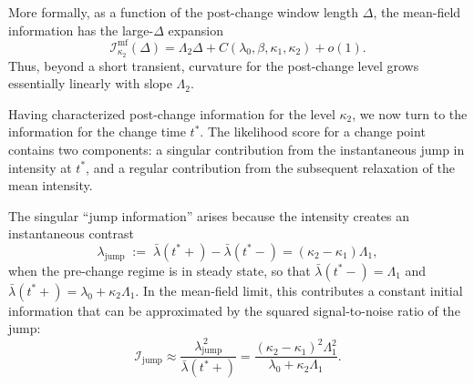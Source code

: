 \documentclass{article}
\theoremstyle{plain}
\theoremstyle{definition}
\newcommand{\1}{\mathbf{1}}
\begin{document}
    More formally, as a function of the post-change window length $\Delta$, the mean-field information has the large-$\Delta$ expansion
    \begin{equation}
    \label{eq:Ikappa2-mf-asymp}
    \mathcal I_{\kappa_2}^{\mathrm{mf}}(\Delta)
    =\Lambda_2 \Delta + C(\lambda_0,\beta,\kappa_1,\kappa_2) + o(1).
    \end{equation}
    Thus, beyond a short transient, curvature for the post-change level grows essentially linearly with slope $\Lambda_2$.
    
    Having characterized post-change information for the level $\kappa_2$, we now turn to the information for the change time $t^\ast$. The likelihood score for a change point contains two components: a singular contribution from the instantaneous jump in intensity at $t^\ast$, and a regular contribution from the subsequent relaxation of the mean intensity.
    
    The singular ``jump information'' arises because the intensity creates an instantaneous contrast
    \[
    \lambda_{\mathrm{jump}}
    \;:=\;
    \bar\lambda(t^\ast+)-\bar\lambda(t^\ast-)
    =
    (\kappa_2-\kappa_1)\Lambda_1,
    \]
    when the pre-change regime is in steady state, so that $\bar\lambda(t^\ast-)=\Lambda_1$ and $\bar\lambda(t^\ast+)=\lambda_0+\kappa_2\Lambda_1$.  In the mean-field limit, this contributes a constant initial information that can be approximated by the squared signal-to-noise ratio of the jump:
    \begin{equation}
    \label{eq:I-jump}
    \mathcal I_{\mathrm{jump}}
    \approx
    \frac{\lambda_{\mathrm{jump}}^{\,2}}{\bar\lambda(t^\ast+)}
    =
    \frac{(\kappa_2-\kappa_1)^2\Lambda_1^2}{\lambda_0+\kappa_2\Lambda_1}.
    \end{equation}
    
\end{document}
